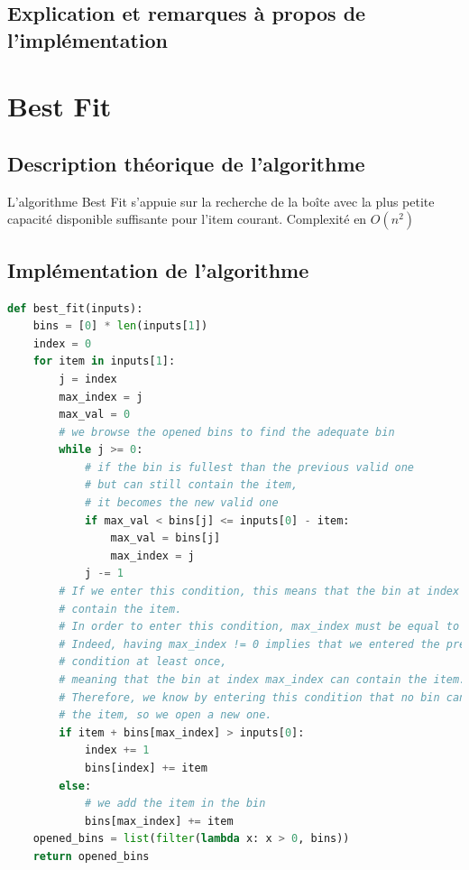 \documentclass{article}
\begin{document}
\subsection{Explication et remarques à propos de l'implémentation}




\section{Best Fit}
\subsection{Description théorique de l'algorithme}
L'algorithme Best Fit s'appuie sur la recherche de la boîte avec la plus petite capacité disponible suffisante pour l'item courant.
Complexité en $O(n^2)$

\subsection{Implémentation de l'algorithme}
\begin{lstlisting}[language=Python, frame=single]
def best_fit(inputs):
    bins = [0] * len(inputs[1])
    index = 0
    for item in inputs[1]:
        j = index
        max_index = j
        max_val = 0
        # we browse the opened bins to find the adequate bin
        while j >= 0:
            # if the bin is fullest than the previous valid one
            # but can still contain the item,
            # it becomes the new valid one
            if max_val < bins[j] <= inputs[0] - item:
                max_val = bins[j]
                max_index = j
            j -= 1
        # If we enter this condition, this means that the bin at index max_index cannot
        # contain the item.
        # In order to enter this condition, max_index must be equal to 0.
        # Indeed, having max_index != 0 implies that we entered the precedent if
        # condition at least once,
        # meaning that the bin at index max_index can contain the item.
        # Therefore, we know by entering this condition that no bin can contain
        # the item, so we open a new one.
        if item + bins[max_index] > inputs[0]:
            index += 1
            bins[index] += item
        else:
            # we add the item in the bin
            bins[max_index] += item
    opened_bins = list(filter(lambda x: x > 0, bins))
    return opened_bins
\end{lstlisting}
\end{document}
